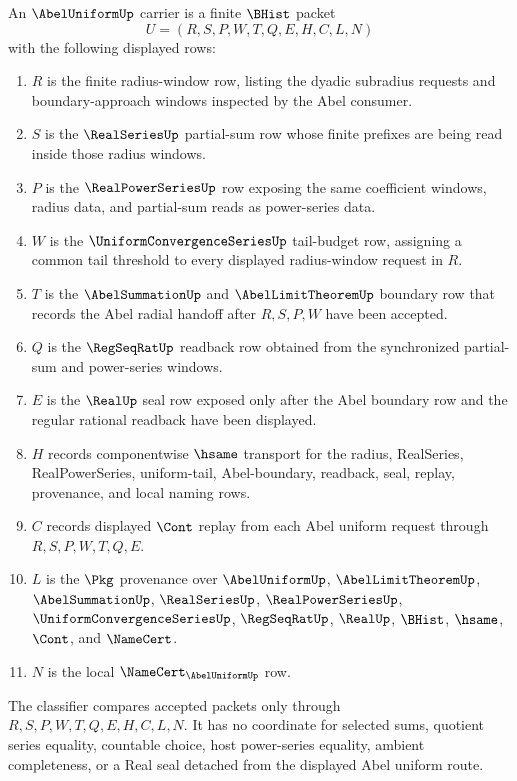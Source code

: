 \begin{definition}
\label{def:abel-uniform-carrier}
An $\AbelUniformUp$ carrier is a finite $\BHist$ packet
$$
U=(R,S,P,W,T,Q,E,H,C,L,N)
$$
with the following displayed rows:
\begin{enumerate}
\item $R$ is the finite radius-window row, listing the dyadic subradius requests and boundary-approach windows inspected by the Abel consumer.
\item $S$ is the $\RealSeriesUp$ partial-sum row whose finite prefixes are being read inside those radius windows.
\item $P$ is the $\RealPowerSeriesUp$ row exposing the same coefficient windows, radius data, and partial-sum reads as power-series data.
\item $W$ is the $\UniformConvergenceSeriesUp$ tail-budget row, assigning a common tail threshold to every displayed radius-window request in $R$.
\item $T$ is the $\AbelSummationUp$ and $\AbelLimitTheoremUp$ boundary row that records the Abel radial handoff after $R,S,P,W$ have been accepted.
\item $Q$ is the $\RegSeqRatUp$ readback row obtained from the synchronized partial-sum and power-series windows.
\item $E$ is the $\RealUp$ seal row exposed only after the Abel boundary row and the regular rational readback have been displayed.
\item $H$ records componentwise $\hsame$ transport for the radius, RealSeries, RealPowerSeries, uniform-tail, Abel-boundary, readback, seal, replay, provenance, and local naming rows.
\item $C$ records displayed $\Cont$ replay from each Abel uniform request through $R,S,P,W,T,Q,E$.
\item $L$ is the $\Pkg$ provenance over $\AbelUniformUp$, $\AbelLimitTheoremUp$, $\AbelSummationUp$, $\RealSeriesUp$, $\RealPowerSeriesUp$, $\UniformConvergenceSeriesUp$, $\RegSeqRatUp$, $\RealUp$, $\BHist$, $\hsame$, $\Cont$, and $\NameCert$.
\item $N$ is the local $\NameCert_{\AbelUniformUp}$ row.
\end{enumerate}
The classifier compares accepted packets only through $R,S,P,W,T,Q,E,H,C,L,N$. It has no coordinate for selected sums, quotient series equality, countable choice, host power-series equality, ambient completeness, or a Real seal detached from the displayed Abel uniform route.
\end{definition}

